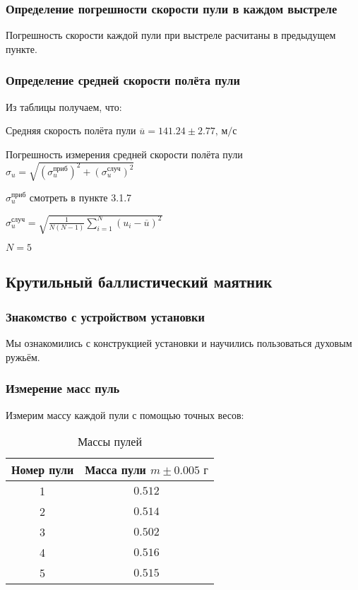 \documentclass[a4paper]{article}
\begin{document}
\subsubsection{Определение погрешности скорости пули в каждом выстреле}

Погрешность скорости каждой пули при выстреле расчитаны в предыдущем пункте.

\subsubsection{Определение средней скорости полёта пули}

Из таблицы получаем, что:

\item Средняя скорость полёта пули $\overline{u} = 141.24 \pm{2.77} \text{, м/с}$

\item Погрешность измерения средней скорости полёта пули $\sigma_u = \sqrt{(\sigma_u^{\text{приб}})^2 + (\sigma_u^{\text{случ}})^2}$

\item $\sigma_u^{\text{приб}}$ смотреть в пункте 3.1.7

\item $\sigma_u^{\text{случ}} = \sqrt{\frac{1}{N(N-1)} \sum_{i = 1}^{N} (u_i - \overline{u})^2}$

\item $N = 5$


\newpage

\subsection{Крутильный баллистический маятник}

\subsubsection{Знакомство с устройством установки}

Мы ознакомились с конструкцией установки и научились пользоваться духовым ружьём.

\subsubsection{Измерение масс пуль}

Измерим массу каждой пули с помощью точных весов:

\begin{table}[h!]
\centering
\caption{Массы пулей}
\begin{tabular}{|c|c|}
\hline
Номер пули & Масса пули $m \pm{0.005}\text{ г}$  \\ \hline
1  & $0.512$ \\ \hline
2  & $0.514$ \\ \hline
3  & $0.502$ \\ \hline
4  & $0.516$ \\ \hline
5  & $0.515$ \\ \hline
\end{tabular}
\end{table}
\end{document}
